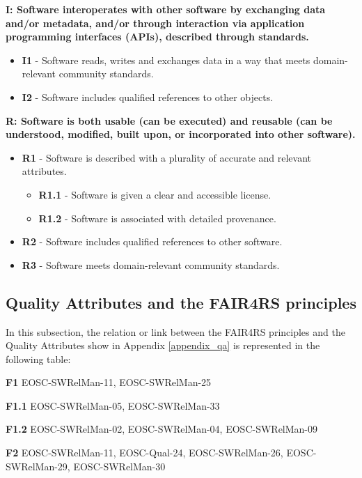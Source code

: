 \textbf{I: Software interoperates with other software by exchanging data and/or metadata, and/or
through interaction via application programming interfaces (APIs), described through
standards.}

\begin{itemize}
    \item \textbf{I1} - Software reads, writes and exchanges data in a way that meets domain-relevant community standards.
    \item \textbf{I2} - Software includes qualified references to other objects.
\end{itemize}

\textbf{R: Software is both usable (can be executed) and reusable (can be understood, modified, built
upon, or incorporated into other software).}

\begin{itemize}
    \item \textbf{R1} - Software is described with a plurality of accurate and relevant attributes.

    \begin{itemize}
        \item \textbf{R1.1} - Software is given a clear and accessible license.
        \item \textbf{R1.2} - Software is associated with detailed provenance.
    \end{itemize}

    \item \textbf{R2} - Software includes qualified references to other software.
    \item \textbf{R3} - Software meets domain-relevant community standards.
\end{itemize}

\subsection{Quality Attributes and the FAIR4RS principles}

In this subsection, the relation or link between the FAIR4RS principles and the Quality Attributes
show in Appendix \ref{appendix_qa} is represented in the following table:

\textbf{F1} EOSC-SWRelMan-11, EOSC-SWRelMan-25

\textbf{F1.1} EOSC-SWRelMan-05, EOSC-SWRelMan-33

\textbf{F1.2} EOSC-SWRelMan-02, EOSC-SWRelMan-04, EOSC-SWRelMan-09

\textbf{F2} EOSC-SWRelMan-11, EOSC-Qual-24, EOSC-SWRelMan-26, EOSC-SWRelMan-29, EOSC-SWRelMan-30

